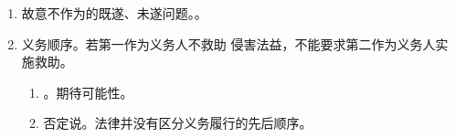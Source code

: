 \begin{enumerate}
\begin{enumerate}
                \begin{enumerate}
                  \item 事实认识错误。。
                  \item 法律认识错误。。
                \end{enumerate}
          \item 故意不作为的既遂、未遂问题。。
          \item 义务顺序。若第一作为义务人不救助 \hz 侵害法益，不能要求第二作为义务人实施救助。
                \begin{enumerate}
                  \item {}。期待可能性。
                  \item 否定说。法律并没有区分义务履行的先后顺序。
                \end{enumerate}
        \end{enumerate}
\end{enumerate}
